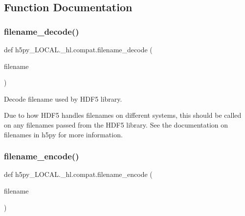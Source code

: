 \subsection{Function Documentation}
\mbox{\label{namespaceh5py__LOCAL_1_1__hl_1_1compat_ae4262f370973f368bf6a3b68ab22c5cf}} 
\subsubsection{\texorpdfstring{filename\+\_\+decode()}{filename\_decode()}}
{\footnotesize\ttfamily def h5py\+\_\+\+L\+O\+C\+A\+L.\+\_\+hl.\+compat.\+filename\+\_\+decode (\begin{DoxyParamCaption}\item[{}]{filename }\end{DoxyParamCaption})}

\begin{DoxyVerb}Decode filename used by HDF5 library.

Due to how HDF5 handles filenames on different systems, this should be
called on any filenames passed from the HDF5 library. See the documentation
on filenames in h5py for more information.
\end{DoxyVerb}
 \mbox{\label{namespaceh5py__LOCAL_1_1__hl_1_1compat_a1a45bbd1f0d4b6481950a6a083ccb622}} 
\subsubsection{\texorpdfstring{filename\+\_\+encode()}{filename\_encode()}}
{\footnotesize\ttfamily def h5py\+\_\+\+L\+O\+C\+A\+L.\+\_\+hl.\+compat.\+filename\+\_\+encode (\begin{DoxyParamCaption}\item[{}]{filename }\end{DoxyParamCaption})}

